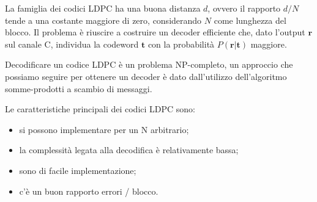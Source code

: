 	La famiglia dei codici LDPC ha una buona distanza $d$, ovvero il rapporto $d/N$ tende a una costante maggiore di zero, considerando $N$ come lunghezza del blocco. Il problema è riuscire a costruire un decoder efficiente che, dato l'output $\textbf{r}$ sul canale C, individua la codeword $\textbf{t}$ con la probabilità $P(\textbf{r}|\textbf{t})$ maggiore. 

Decodificare un codice LDPC è un problema NP-completo, un approccio che possiamo seguire per ottenere un decoder è dato dall'utilizzo dell'algoritmo somme-prodotti a scambio di messaggi.

	Le caratteristiche principali dei codici LDPC sono: 
	\begin{itemize}
		\item si possono implementare per un N arbitrario;
		\item la complessità legata alla decodifica è relativamente bassa;
		\item sono di facile implementazione;
		\item c'è un buon rapporto errori / blocco.
	\end{itemize}